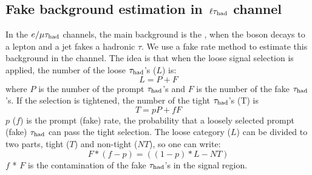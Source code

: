 \subsection{\texorpdfstring{Fake background estimation in $\,\ell\tau_{\rm had}$ channel}{Fake background estimation in lepton-tau channel}}
\label{sect:bkgFake}
In the $e/\mu\tau_{\rm had}$ channels, the main background is the \wjets, when the \Wpm boson decays to a lepton and a jet fakes a hadronic $\tau$.
We use a fake rate method to estimate this background \cite{CMS_AN_2010-261} in the \muTau channel.
The idea is that when the loose signal selection is applied, the number of the loose $\tau_{\rm had}$'s ($L$) is:
\begin{equation}
L = P + F
\end{equation}
where $P$ is the number of the  prompt $\tau_{\rm had}$'s and $F$ is the number of the  fake $\tau_{\rm had}$'s. If the selection is tightened, the number of the tight $\tau_{\rm had}$'s (T) is
\begin{equation}
 T = pP + fF
\end{equation} 
$p$ ($f$) is the prompt (fake) rate, the probability that a loosely selected prompt (fake) $\tau_{\rm had}$ can pass the  tight  selection. The loose category ($L$) can be divided to two parts, 
tight ($T$) and non-tight ($NT$), so one can write:
\begin{equation}
   F * (f - p) = ((1 - p) * L - NT)
\label{eq:F}
\end{equation}
$f$ * $F$ is the contamination of the fake $\tau_{\rm had}$'s in the signal region. 

